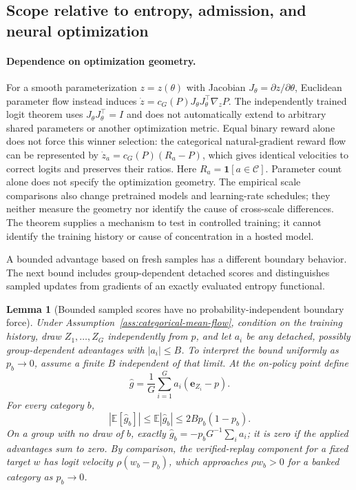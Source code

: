 \documentclass{article}
\newcommand{\1}{\mathbf 1}
\newcommand{\E}{\mathbb E}
\newtheorem{lemma}{Lemma}[section]
\theoremstyle{remark}
\theoremstyle{definition}
\theoremstyle{plain}
\begin{document}
\subsection{Scope relative to entropy, admission, and neural optimization}
\label{app:theory-entropy}
\label{app:theory-entropy-comparison}

\paragraph{Dependence on optimization geometry.}
For a smooth parameterization $z=z(\theta)$ with Jacobian
$J_\theta=\partial z/\partial\theta$, Euclidean parameter flow instead
induces $\dot z=c_G(P)J_\theta J_\theta^\top\nabla_zP$. The independently
trained logit theorem uses $J_\theta J_\theta^\top=I$ and does not automatically
extend to arbitrary shared parameters or another optimization metric. Equal
binary reward alone does not force this winner selection: the categorical
natural-gradient reward flow can be represented by
$\dot z_a=c_G(P)(R_a-P)$, which gives identical velocities to correct logits
and preserves their ratios. Here $R_a=\1[a\in\mathcal C]$.
Parameter count alone does not specify the optimization geometry. The empirical
scale
comparisons also change pretrained models and learning-rate schedules; they
neither measure the geometry nor identify the cause of cross-scale differences.
The theorem supplies a mechanism to test in controlled training; it cannot
identify the training history or cause of concentration in a hosted model.

A bounded advantage based on fresh samples has a different boundary behavior.
The next bound includes group-dependent detached scores and distinguishes
sampled updates from gradients of an exactly evaluated entropy functional.

\begin{lemma}[Bounded sampled scores have no probability-independent boundary force]
\label{lem:sampled-score-bound}
Under Assumption~\ref{ass:categorical-mean-flow}, condition on the training history, draw
$Z_1,\ldots,Z_G$ independently from $p$, and let $a_i$ be any detached,
possibly group-dependent advantages with $|a_i|\le B$. To interpret the
bound uniformly as $p_b\to0$, assume a finite $B$ independent of that limit.
At the on-policy point define
\[
 \widehat g=\frac1G\sum_{i=1}^G a_i(\mathbf e_{Z_i}-p).
\]
For every category $b$,
\[
 |\E[\widehat g_b]|\le\E|\widehat g_b|
 \le 2B p_b(1-p_b).
\]
On a group with no draw of $b$, exactly
$\widehat g_b=-p_bG^{-1}\sum_i a_i$; it is zero if the applied advantages
sum to zero. By comparison, the verified-replay component for a fixed target
$w$ has logit velocity $\rho(w_b-p_b)$, which approaches $\rho w_b>0$
for a banked category as $p_b\to0$.
\end{lemma}
\end{document}
